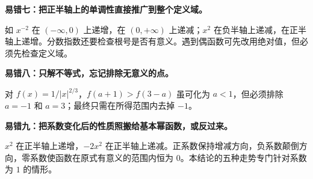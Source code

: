 \clearpage
\begin{trapbox}
\textbf{\textcolor{CTrap}{易错七：把正半轴上的单调性直接推广到整个定义域。}}


      如 $x^{-2}$ 在 $(-\infty,0)$ 上递增，在 $(0,+\infty)$ 上递减；$x^2$ 在负半轴上递减，在正半轴上递增。分数指数还要检查根号是否有意义。遇到偶函数可先改用绝对值，但必须先检查定义域。
    
\end{trapbox}
\clearpage
\begin{trapbox}
\textbf{\textcolor{CTrap}{易错八：只解不等式，忘记排除无意义的点。}}


      对 $f(x)=1/|x|^{2/3}$，$f(a+1)>f(3-a)$ 虽可化为 $a<1$，但必须排除 $a=-1$ 和 $a=3$；最终只需在所得范围内去掉 $-1$。
    
\end{trapbox}
\clearpage
\begin{trapbox}
\textbf{\textcolor{CTrap}{易错九：把系数变化后的性质照搬给基本幂函数，或反过来。}}


      $x^2$ 在正半轴上递增，$-2x^2$ 在正半轴上递减。正系数保持增减方向，负系数颠倒方向，零系数使函数在原式有意义的范围内恒为 $0$。本结论的五种走势专门针对系数为 $1$ 的情形。
  
\end{trapbox}
